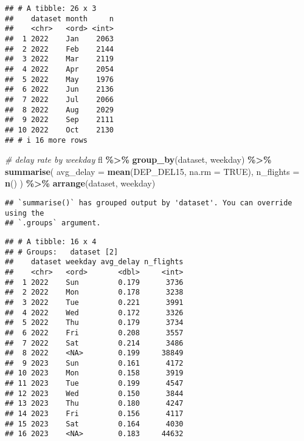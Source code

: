 \documentclass[
]{article}
\newenvironment{Shaded}{\begin{snugshade}}{\end{snugshade}}
\newcommand{\AttributeTok}[1]{\textcolor[rgb]{0.13,0.29,0.53}{#1}}
\newcommand{\CommentTok}[1]{\textcolor[rgb]{0.56,0.35,0.01}{\textit{#1}}}
\newcommand{\ConstantTok}[1]{\textcolor[rgb]{0.56,0.35,0.01}{#1}}
\newcommand{\FunctionTok}[1]{\textcolor[rgb]{0.13,0.29,0.53}{\textbf{#1}}}
\newcommand{\NormalTok}[1]{#1}
\newcommand{\SpecialCharTok}[1]{\textcolor[rgb]{0.81,0.36,0.00}{\textbf{#1}}}
\begin{document}
\begin{verbatim}
## # A tibble: 26 x 3
##    dataset month     n
##    <chr>   <ord> <int>
##  1 2022    Jan    2063
##  2 2022    Feb    2144
##  3 2022    Mar    2119
##  4 2022    Apr    2054
##  5 2022    May    1976
##  6 2022    Jun    2136
##  7 2022    Jul    2066
##  8 2022    Aug    2029
##  9 2022    Sep    2111
## 10 2022    Oct    2130
## # i 16 more rows
\end{verbatim}

\begin{Shaded}
\begin{Highlighting}[]
\CommentTok{\# delay rate by weekday}
\NormalTok{fl }\SpecialCharTok{\%\textgreater{}\%}
  \FunctionTok{group\_by}\NormalTok{(dataset, weekday) }\SpecialCharTok{\%\textgreater{}\%}
  \FunctionTok{summarise}\NormalTok{(}
    \AttributeTok{avg\_delay =} \FunctionTok{mean}\NormalTok{(DEP\_DEL15, }\AttributeTok{na.rm =} \ConstantTok{TRUE}\NormalTok{),}
    \AttributeTok{n\_flights =} \FunctionTok{n}\NormalTok{()}
\NormalTok{  ) }\SpecialCharTok{\%\textgreater{}\%}
  \FunctionTok{arrange}\NormalTok{(dataset, weekday)}
\end{Highlighting}
\end{Shaded}

\begin{verbatim}
## `summarise()` has grouped output by 'dataset'. You can override using the
## `.groups` argument.
\end{verbatim}

\begin{verbatim}
## # A tibble: 16 x 4
## # Groups:   dataset [2]
##    dataset weekday avg_delay n_flights
##    <chr>   <ord>       <dbl>     <int>
##  1 2022    Sun         0.179      3736
##  2 2022    Mon         0.178      3238
##  3 2022    Tue         0.221      3991
##  4 2022    Wed         0.172      3326
##  5 2022    Thu         0.179      3734
##  6 2022    Fri         0.208      3557
##  7 2022    Sat         0.214      3486
##  8 2022    <NA>        0.199     38849
##  9 2023    Sun         0.161      4172
## 10 2023    Mon         0.158      3919
## 11 2023    Tue         0.199      4547
## 12 2023    Wed         0.150      3844
## 13 2023    Thu         0.180      4247
## 14 2023    Fri         0.156      4117
## 15 2023    Sat         0.164      4030
## 16 2023    <NA>        0.183     44632
\end{verbatim}
\end{document}
